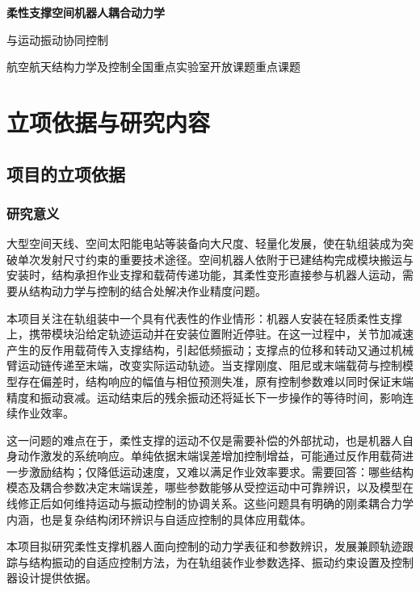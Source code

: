 \documentclass[UTF8,a4paper,zihao=-4,fontset=fandol]{ctexart}
\begin{document}
\begin{center}
 {\bfseries 柔性支撑空间机器人耦合动力学\par
 与运动振动协同控制\par}
 \vspace{0.55em}
 {航空航天结构力学及控制全国重点实验室开放课题\quad 重点课题}
\end{center}
\vspace{0.35em}

\section{立项依据与研究内容}

\subsection{项目的立项依据}

\subsubsection{研究意义}

大型空间天线、空间太阳能电站等装备向大尺度、轻量化发展，使在轨组装成为突破单次发射尺寸约束的重要技术途径。空间机器人依附于已建结构完成模块搬运与安装时，结构承担作业支撑和载荷传递功能，其柔性变形直接参与机器人运动，需要从结构动力学与控制的结合处解决作业精度问题\cite{hu2025,wu2024}。

本项目关注在轨组装中一个具有代表性的作业情形：机器人安装在轻质柔性支撑上，携带模块沿给定轨迹运动并在安装位置附近停驻。在这一过程中，关节加减速产生的反作用载荷传入支撑结构，引起低频振动；支撑点的位移和转动又通过机械臂运动链传递至末端，改变实际运动轨迹。当支撑刚度、阻尼或末端载荷与控制模型存在偏差时，结构响应的幅值与相位预测失准，原有控制参数难以同时保证末端精度和振动衰减。运动结束后的残余振动还将延长下一步操作的等待时间，影响连续作业效率。

这一问题的难点在于，柔性支撑的运动不仅是需要补偿的外部扰动，也是机器人自身动作激发的系统响应。单纯依据末端误差增加控制增益，可能通过反作用载荷进一步激励结构；仅降低运动速度，又难以满足作业效率要求。需要回答：哪些结构模态及耦合参数决定末端误差，哪些参数能够从受控运动中可靠辨识，以及模型在线修正后如何维持运动与振动控制的协调关系。这些问题具有明确的刚柔耦合力学内涵，也是复杂结构闭环辨识与自适应控制的具体应用载体。

本项目拟研究柔性支撑机器人面向控制的动力学表征和参数辨识，发展兼顾轨迹跟踪与结构振动的自适应控制方法，为在轨组装作业参数选择、振动约束设置及控制器设计提供依据。
\end{document}
